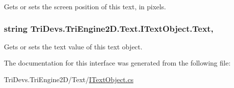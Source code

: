 Gets or sets the screen position of this text, in pixels. 

\hypertarget{interface_tri_devs_1_1_tri_engine2_d_1_1_text_1_1_i_text_object_ad2e24adb672d6b09a330b7741469ee62}{
\subsubsection[{Text}]{\setlength{\rightskip}{0pt plus 5cm}string Tri\-Devs.\-Tri\-Engine2\-D.\-Text.\-I\-Text\-Object.\-Text\hspace{0.3cm}{\ttfamily [get]}, {\ttfamily [set]}}}\label{interface_tri_devs_1_1_tri_engine2_d_1_1_text_1_1_i_text_object_ad2e24adb672d6b09a330b7741469ee62}


Gets or sets the text value of this text object. 



The documentation for this interface was generated from the following file\-:\begin{DoxyCompactItemize}
\item 
Tri\-Devs.\-Tri\-Engine2\-D/\-Text/\hyperlink{_i_text_object_8cs}{I\-Text\-Object.\-cs}\end{DoxyCompactItemize}
